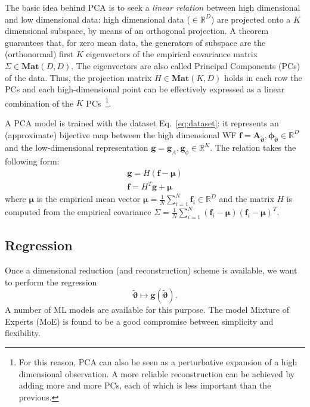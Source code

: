 \documentclass[twocolumn,showpacs,preprintnumbers,nofootinbib,prd,
superscriptaddress,10pt]{revtex4-1}
\newcommand{\R}{\mathbb{R}}
\begin{document}
The basic idea behind PCA is to seek a \textit{linear relation} between high dimensional and low dimensional data: high dimensional data ($\in \R^D$) are projected onto a $K$ dimensional subspace, by means of an orthogonal projection.
A theorem~\cite[Sec. 12.2.1]{murphy2012machine} guarantees that, for zero mean data, the generators of subspace are the (orthonormal) first $K$ eigenvectors of the empirical covariance matrix $\Sigma \in \mathbf{Mat}(D,D)$. The eigenvectors are also called Principal Components (PCs) of the data.
Thus, the projection matrix $H\in \mathbf{Mat}(K,D)$ holds in each row the PCs and each high-dimensional point can be effectively expressed as a linear combination of the $K$ PCs~\footnote{For this reason, PCA can also be seen as a perturbative expansion of a high dimensional observation. A more reliable reconstruction can be achieved by adding more and more PCs, each of which is less important than the previous.}.

A PCA model is trained with the dataset Eq.~\eqref{eq:dataset}: it represents an (approximate) bijective map between the high dimensional WF $\mathbf{f} = \boldsymbol{A}_{\tilde{\boldsymbol{\vartheta}}}, \boldsymbol{\phi}_{\tilde{\boldsymbol{\vartheta}}} \in \R^D$ and the low-dimensional representation $\mathbf{g} = \mathbf{g}_A , \mathbf{g}_\phi \in \R^K$.
The relation takes the following form:
\begin{align}
	\mathbf{g} = H (\mathbf{f} - \boldsymbol{\mu}) \label{eq:PCA_reduction_model}\\
	\mathbf{f} = H^T \mathbf{g} + \boldsymbol{\mu} \label{eq:PCA_reconstruction_model}
\end{align}
where $\boldsymbol{\mu}$ is the empirical mean vector ${\boldsymbol{\mu} = \frac{1}{N} \sum_{i=1}^N \boldsymbol{f}_i \in \R^D}$ and the matrix $H$ is computed from the empirical covariance ${\Sigma = \frac{1}{N} \sum_{i=1}^N (\mathbf{f}_i-\boldsymbol{\mu}) (\mathbf{f}_i-\boldsymbol{\mu})^T}$.


\subsection{Regression}
Once a dimensional reduction (and reconstruction) scheme is available, we want to perform the regression
\begin{equation} \label{eq:regression_model}
	{\tilde{\boldsymbol{\vartheta}}} \longmapsto \boldsymbol{g}({\tilde{\boldsymbol{\vartheta}}}).
\end{equation}
A number of ML models are available for this purpose. The model Mixture of Experts (MoE) \cite{Jacobs1991AdaptiveMoE} \cite[ch. 11]{murphy2012machine} is found to be a good compromise between simplicity and flexibility.
\end{document}
